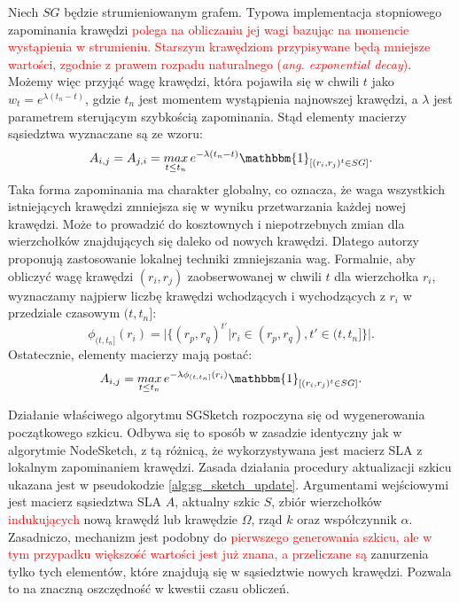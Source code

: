             Niech $SG$ będzie strumieniowanym grafem. Typowa implementacja stopniowego zapominania krawędzi \textcolor{red}{polega na obliczaniu jej wagi bazując na momencie wystąpienia w strumieniu. Starszym krawędziom przypisywane będą mniejsze wartości, zgodnie z prawem rozpadu naturalnego (\emph{ang. exponential decay})}. Możemy więc przyjąć wagę krawędzi, która pojawiła się w chwili $t$ jako $w_t = e^{\lambda(t_n - t)}$, gdzie $t_n$ jest momentem wystąpienia najnowszej krawędzi, a $\lambda$ jest parametrem sterującym szybkością zapominania. Stąd elementy macierzy sąsiedztwa wyznaczane są ze wzoru:
            \begin{equation} \label{eq:sg_sketch_1}  
                A_{i,j} = A_{j,i} = \mathop{max}_{t \leq t_n} e^{-\lambda (t_n - t)}\mathbbm{1}_{[(r_i, r_j)^{t} \in SG]}.
            \end{equation}
            Taka forma zapominania ma charakter globalny, co oznacza, że  waga wszystkich istniejących krawędzi zmniejsza się w wyniku przetwarzania każdej nowej krawędzi. Może to prowadzić do kosztownych i niepotrzebnych zmian dla wierzchołków znajdujących się daleko od nowych krawędzi. Dlatego autorzy proponują zastosowanie lokalnej techniki zmniejszania wag. Formalnie, aby obliczyć wagę krawędzi $(r_i, r_j)$ zaobserwowanej w chwili $t$ dla wierzchołka $r_i$, wyznaczamy najpierw liczbę krawędzi wchodzących i wychodzących z $r_i$ w przedziale czasowym $(t,t_n]$: 
            \begin{equation} \label{eq:sg_sketch_2}  
                \phi_{(t,t_n]}(r_i) = \vert \{(r_p, r_q)^{t'} \vert r_i \in (r_p, r_q), t' \in (t,t_n] \} \vert.
            \end{equation}
            Ostatecznie, elementy macierzy mają postać:
            \begin{equation} \label{eq:sg_sketch_3}  
                A_{i,j} = \mathop{max}_{t \leq t_n} e^{-\lambda \phi_{(t,t_n]}(r_i)}\mathbbm{1}_{[(r_i, r_j)^{t} \in SG]}.
            \end{equation}

            Działanie właściwego algorytmu SGSketch rozpoczyna się od wygenerowania początkowego szkicu. Odbywa się to sposób w zasadzie identyczny jak w algorytmie NodeSketch, z tą różnicą, że wykorzystywana jest macierz SLA z lokalnym zapominaniem krawędzi. Zasada działania procedury aktualizacji szkicu ukazana jest w pseudokodzie \ref{alg:sg_sketch_update}. Argumentami wejściowymi jest macierz sąsiedztwa SLA $A$, aktualny szkic $S$, zbiór wierzchołków \textcolor{red}{indukujących} nową krawędź lub krawędzie $\Omega$, rząd $k$ oraz współczynnik $\alpha$. Zasadniczo, mechanizm jest podobny do \textcolor{red}{pierwszego generowania szkicu, ale w tym przypadku większość wartości jest już znana, a przeliczane są} zanurzenia tylko tych elementów, które znajdują się w sąsiedztwie nowych krawędzi. Pozwala to na znaczną oszczędność w kwestii czasu obliczeń. 

